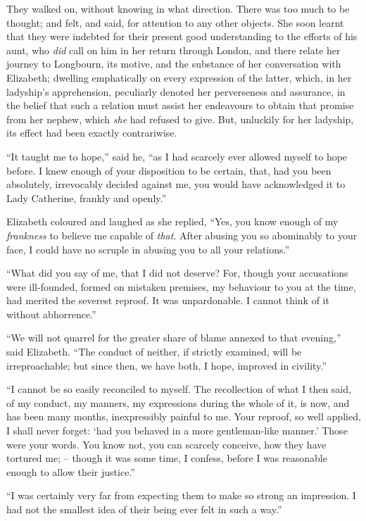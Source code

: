 They walked on, without knowing in what direction.
There was too much to be thought; and felt, and said,
for attention to any other objects. She soon learnt that
they were indebted for their present good understanding
to the efforts of his aunt, who \textit{did} call on him in her
return through London, and there relate her journey to
Longbourn, its motive, and the substance of her conversation
with Elizabeth; dwelling emphatically on every
expression of the latter, which, in her ladyship’s apprehension,
peculiarly denoted her perverseness and assurance,
in the belief that such a relation must assist her
endeavours to obtain that promise from her nephew,
which \textit{she} had refused to give. But, unluckily for her
ladyship, its effect had been exactly contrariwise.

“It taught me to hope,” said he, “as I had scarcely
ever allowed myself to hope before. I knew enough of
your disposition to be certain, that, had you been absolutely,
irrevocably decided against me, you would have
acknowledged it to Lady Catherine, frankly and openly.”

Elizabeth coloured and laughed as she replied, “Yes,
you know enough of my \textit{frankness} to believe me capable
of \textit{that}. After abusing you so abominably to your face,
I could have no scruple in abusing you to all your relations.”

“What did you say of me, that I did not deserve?
For, though your accusations were ill-founded, formed
on mistaken premises, my behaviour to you at the time,
had merited the severest reproof. It was unpardonable.
I cannot think of it without abhorrence.”

“We will not quarrel for the greater share of blame
annexed to that evening,” said Elizabeth. “The conduct
of neither, if strictly examined, will be irreproachable;
but since then, we have both, I hope, improved in civility.”

“I cannot be so easily reconciled to myself. The
recollection of what I then said, of my conduct, my
manners, my expressions during the whole of it, is now,
and has been many months, inexpressibly painful to me.
Your reproof, so well applied, I shall never forget: ‘had
you behaved in a more gentleman-like manner.’ Those
were your words. You know not, you can scarcely conceive,
how they have tortured me; -- though it was some
time, I confess, before I was reasonable enough to allow
their justice.”

“I was certainly very far from expecting them to make
so strong an impression. I had not the smallest idea of
their being ever felt in such a way.”

